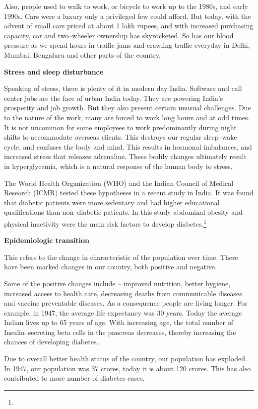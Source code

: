 Also, people used to walk to work, or bicycle to work up to the 1980s, and early 1990s. Cars were a luxury only a privileged few could afford. But today, with the advent of small cars priced at about 1 lakh rupees, and with increased purchasing capacity, car and two–wheeler ownership has skyrocketed. So has our blood pressure as we spend hours in traffic jams and crawling traffic everyday in Delhi, Mumbai, Bengaluru and other parts of the country.

\textbf{Stress and sleep disturbance}

Speaking of stress, there is plenty of it in modern day India. Software and call center jobs are the face of urban India today. They are powering India’s prosperity and job growth. But they also present certain unusual challenges. Due to the nature of the work, many are forced to work long hours and at odd times. It is not uncommon for some employees to work predominantly during night shifts to accommodate overseas clients. This destroys our regular sleep–wake cycle, and confuses the body and mind. This results in hormonal imbalances, and increased stress that releases adrenaline. These bodily changes ultimately result in hyperglycemia, which is a natural response of the human body to stress.

The World Health Organization (WHO) and the Indian Council of Medical Research (ICMR) tested these hypotheses in a recent study in India. It was found that diabetic patients were more sedentary and had higher educational qualifications than non–diabetic patients. In this study abdominal obesity and physical inactivity were the main risk factors to develop diabetes.\footnote{}

\textbf{Epidemiologic transition}

This refers to the change in characteristic of the population over time. There have been marked changes in our country, both positive and negative.

Some of the positive changes include – improved nutrition, better hygiene, increased access to health care, decreasing deaths from communicable diseases and vaccine preventable diseases. As a consequence people are living longer. For example, in 1947, the average life expectancy was 30 years. Today the average Indian lives up to 65 years of age. With increasing age, the total number of Insulin–secreting beta cells in the pancreas decreases, thereby increasing the chances of developing diabetes.

Due to overall better health status of the country, our population has exploded. In 1947, our population was 37 crores, today it is about 120 crores. This has also contributed to more number of diabetes cases.

